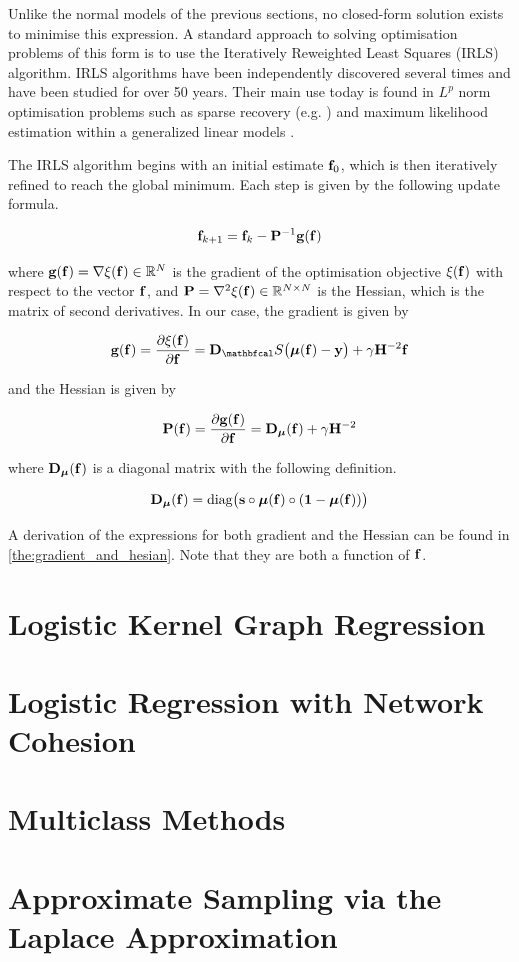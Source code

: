 Unlike the normal models of the previous sections, no closed-form solution exists to minimise this expression. A standard approach to solving optimisation problems of this form is to use the Iteratively Reweighted Least Squares (IRLS) algorithm. IRLS algorithms have been independently discovered several times and have been studied for over 50 years. Their main use today is found in $L^p$ norm optimisation problems such as sparse recovery (e.g. \cite{Gorodnitsky1997,Daubechies2010}) and maximum likelihood estimation within a generalized linear models \citep{Nelder1972}. 

The IRLS algorithm begins with an initial estimate $\mathbf{f}_0$, which is then iteratively refined to reach the global minimum. Each step is given by the following update formula. 

\begin{equation}
    \mathbf{f}_{k+1} = \mathbf{f}_{k} - \mathbf{P}^{-1} \mathbf{g}(\mathbf{f})
\end{equation}

where $ \mathbf{g}(\mathbf{f}) = \nabla \xi(\mathbf{f}) \in \mathbb{R}^N$ is the gradient of the optimisation objective $\xi(\mathbf{f})$ with respect to the vector $\mathbf{f}$, and $\mathbf{P} = \nabla^2 \xi(\mathbf{f}) \in \mathbb{R}^{N \times N}$ is the Hessian, which is the matrix of second derivatives. In our case, the gradient is given by 

\begin{equation}
    \g(\f) = \frac{\partial \xi(\f)}{\partial \f} = \D_\St \big(\muu(\f) - \y\big) + \gamma \HH^{-2} \f
\end{equation}

and the Hessian is given by 

\begin{equation}
    \mathbf{P}(\mathbf{f}) = \frac{\partial \mathbf{g}(\mathbf{f})}{\partial \mathbf{f}} =  \mathbf{D}_{\boldsymbol{\mu}}(\mathbf{f}) + \gamma \mathbf{H}^{-2}
\end{equation}

where $\mathbf{D}_{\boldsymbol{\mu}}(\mathbf{f})$ is a diagonal matrix with the following definition. 

\begin{equation*}
    \mathbf{D}_{\boldsymbol{\mu}}(\mathbf{f}) = \text{diag}\big(\mathbf{s} \circ \boldsymbol{\mu}(\mathbf{f}) \circ (\mathbf{1} - \boldsymbol{\mu}(\mathbf{f}))\big)
\end{equation*}

A derivation of the expressions for both gradient and the Hessian can be found in \cref{the:gradient_and_hesian}. Note that they are both a function of $\mathbf{f}$. 


\section{Logistic Kernel Graph Regression} 

 
\label{sec:lkgr}


\section{Logistic Regression with Network Cohesion}

\label{sec:lrnc}

\section{Multiclass Methods}

\label{sec:multiclass}


\section{Approximate Sampling via the Laplace Approximation}

\label{sec:lsamp}

